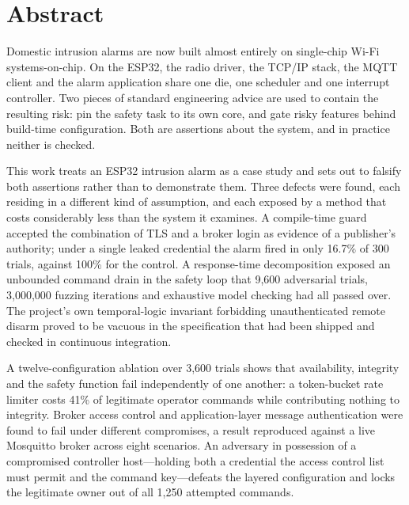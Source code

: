 \chapter*{Abstract}

\noindent Domestic intrusion alarms are now built almost entirely on single-chip Wi-Fi
systems-on-chip. On the ESP32, the radio driver, the TCP/IP stack, the MQTT client and the
alarm application share one die, one scheduler and one interrupt controller. Two pieces of
standard engineering advice are used to contain the resulting risk: pin the safety task to its
own core, and gate risky features behind build-time configuration. Both are assertions about
the system, and in practice neither is checked.

\vspace{6pt}
\noindent This work treats an ESP32 intrusion alarm as a case study and sets out to falsify
both assertions rather than to demonstrate them. Three defects were found, each residing in a
different kind of assumption, and each exposed by a method that costs considerably less than
the system it examines. A compile-time guard accepted the combination of TLS and a broker login
as evidence of a publisher's authority; under a single leaked credential the alarm fired in
only 16.7\% of 300 trials, against 100\% for the control. A response-time decomposition
exposed an unbounded command drain in the safety loop that 9,600 adversarial trials, 3,000,000
fuzzing iterations and exhaustive model checking had all passed over. The project's own
temporal-logic invariant forbidding unauthenticated remote disarm proved to be vacuous in the
specification that had been shipped and checked in continuous integration.

\vspace{6pt}
\noindent A twelve-configuration ablation over 3,600 trials shows that availability, integrity
and the safety function fail independently of one another: a token-bucket rate limiter costs
41\% of legitimate operator commands while contributing nothing to integrity. Broker access
control and application-layer message authentication were found to fail under different
compromises, a result reproduced against a live Mosquitto broker across eight scenarios. An
adversary in possession of a compromised controller host---holding both a credential the access
control list must permit and the command key---defeats the layered configuration and locks the
legitimate owner out of all 1,250 attempted commands.

